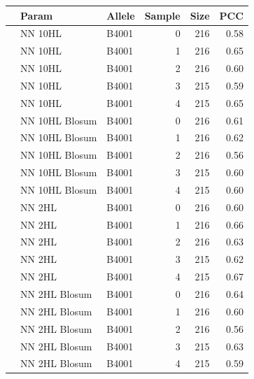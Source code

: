 \documentclass[presentation]{beamer}   %
\begin{document}
\begin{frame}
\begin{table}[hb]\scriptsize
\begin{center}
\begin{tabular}{rllrrr}
  \hline
 & Param & Allele & Sample & Size & PCC \\ 
  \hline
   & NN 10HL & B4001 &   0 & 216 & 0.58 \\ 
   & NN 10HL & B4001 &   1 & 216 & 0.65 \\ 
   & NN 10HL & B4001 &   2 & 216 & 0.60 \\ 
   & NN 10HL & B4001 &   3 & 215 & 0.59 \\ 
   & NN 10HL & B4001 &   4 & 215 & 0.65 \\ 
\hline
   & NN 10HL Blosum & B4001 &   0 & 216 & 0.61 \\ 
   & NN 10HL Blosum & B4001 &   1 & 216 & 0.62 \\ 
   & NN 10HL Blosum & B4001 &   2 & 216 & 0.56 \\ 
   & NN 10HL Blosum & B4001 &   3 & 215 & 0.60 \\ 
   & NN 10HL Blosum & B4001 &   4 & 215 & 0.60 \\ 
\hline
   & NN 2HL & B4001 &   0 & 216 & 0.60 \\ 
   & NN 2HL & B4001 &   1 & 216 & 0.66 \\ 
   & NN 2HL & B4001 &   2 & 216 & 0.63 \\ 
   & NN 2HL & B4001 &   3 & 215 & 0.62 \\ 
   & NN 2HL & B4001 &   4 & 215 & 0.67 \\ 
\hline
   & NN 2HL Blosum & B4001 &   0 & 216 & 0.64 \\ 
   & NN 2HL Blosum & B4001 &   1 & 216 & 0.60 \\ 
   & NN 2HL Blosum & B4001 &   2 & 216 & 0.56 \\ 
   & NN 2HL Blosum & B4001 &   3 & 215 & 0.63 \\ 
   & NN 2HL Blosum & B4001 &   4 & 215 & 0.59 \\ 
   \hline
\end{tabular}
\end{center}
\end{table}
\end{frame}
\end{document}
